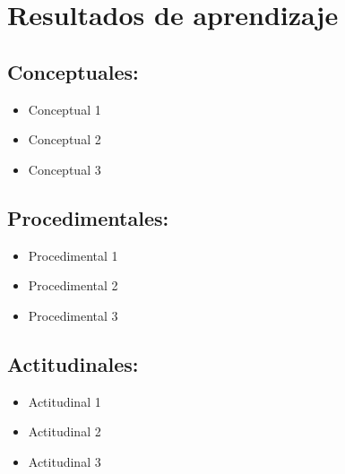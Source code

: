 \section{Resultados de aprendizaje}

\subsection*{Conceptuales:}
\begin{itemize}
    \item Conceptual 1
    \item Conceptual 2
    \item Conceptual 3
\end{itemize}

\subsection*{Procedimentales:}
\begin{itemize}
    \item Procedimental 1
    \item Procedimental 2
    \item Procedimental 3
\end{itemize}

\subsection*{Actitudinales:}
\begin{itemize}
    \item Actitudinal 1
    \item Actitudinal 2
    \item Actitudinal 3
\end{itemize}
\pagebreak
